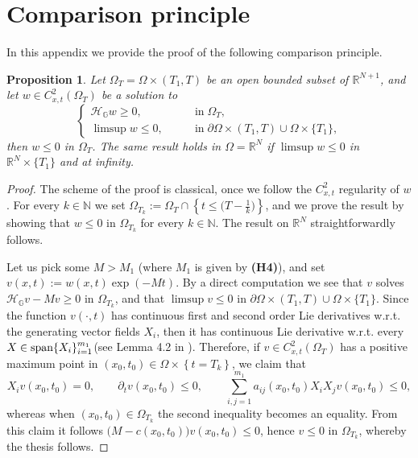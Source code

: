 \documentclass[11pt,a4paper]{article}
\newtheorem{proposition}[theorem]{\bf Proposition}
\numberwithin{equation}{section}
\newcommand{\N}{\mathbb{N}}
\def \rn {{\mathbb {R}}^{N}}
\def \rnn {{\mathbb {R}}^{N+1}}
\def \GG {{\mathbb{G}}}
\def \p {\partial}
\def \span {{\text{\rm span}}}
\def \H {\mathscr{H}_\GG}
\def \O {{\Omega}}
\begin{document}
{{\section{Comparison principle}\label{Comparison}
In this appendix we provide the proof of the following comparison principle.
\begin{proposition}\label{Prop-comparison}
	Let $\O_T=\O\times (T_1,T)$ be an open bounded subset of $\rnn$, and let $w\in C^2_{x,t}(\O_T)$ be a solution to
	\begin{equation}	
		\begin{cases}
			\H w\geq 0,\qquad \;\;&\mathrm{in}\;\O_T,\\
			\limsup w \leq 0, \qquad &\mathrm{in}\;\p\O\times(T_1,T)\cup \O \times\{T_1\},
		\end{cases}
	\end{equation}
	then $w\leq 0$ in $\O_T$. The same result holds in $\O=\rn$ if 	$\limsup w \leq 0$ in $\rn \times\{T_1\}$ and at infinity.
\end{proposition}
\begin{proof}
	The scheme of the proof is classical, once we follow the $C^2_{x,t}$ regularity of $w$. For every $k\in \N$ we set $\O_{T_k} := \O_T\cap\left\{t\leq \big(T-\frac{1}{k}\big)\right\}$, and we prove the result by showing that $w\leq 0$ in $\O_{T_k}$ for every $k \in \N$. The result on $\rn$ straightforwardly follows.


	Let us pick some $M>M_1$ (where $M_1$ is given by \textbf{(H4)}), and set $v(x,t):=w(x,t)\exp({-M t})$. By a direct computation we see that $v$ solves $	\H v - M v \geq 0$ in $\O_{T_k}$, and that $\limsup v \leq 0$ in $ \p\O\times(T_1,T)\cup \O \times\{T_1\}$. Since the function $v(\cdot,t)$ has continuous first and second order Lie derivatives w.r.t. the generating vector fields $X_i$, then it has continuous Lie derivative w.r.t. every $X\in \span\{X_i\}_{i=1}^{m_1}$(see Lemma 4.2 in \cite{bonfiglioli2004fundamental}). Therefore, if $v\in C^2_{x,t}(\O_T)$ has a positive maximum point in $(x_0,t_0)\in \O\times \left\{t = T_k\right\}$, we claim that
	\begin{equation}\label{maximum-point}
		X_iv(x_0,t_0) = 0,\qquad  \p_t 	v(x_0,t_0)\leq 0,\qquad \sum_{i,j=1}^{m_1}a_{ij}(x_0,t_0)X_iX_j v(x_0,t_0)\leq 0,
	\end{equation}
	whereas when $(x_0,t_0)\in \O_{T_k}$ the second inequality becomes an equality. From this claim it follows $\big(M-c(x_0,t_0)\big)v(x_0,t_0)\leq 0$, hence $v\leq 0$ in $\O_{T_k}$, whereby the thesis follows. 



\end{proof}}}
\end{document}
